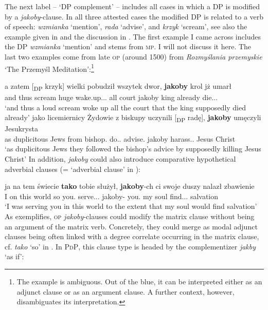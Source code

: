 \documentclass[output=paper
,modfonts
,nonflat]{langsci/langscibook}
\begin{document}
The next label – `DP complement' – includes all cases in which a DP is modified by a \emph{jakoby}-clause. In all three attested cases the modified DP is related to a verb of speech: \emph{wzmianka} `mention', \emph{rada} `advise', and \emph{krzyk} `scream', see also the example given in  and the discussion in . The first example I came across includes the DP \emph{wzmianka} `mention' and stems from \textsc{mp}. I will not discuss it here. The last two examples come from late \textsc{op} (around 1500) from \emph{Rozmyślania przemyskie} `The Przemyśl Meditation':\footnote{The example  is ambiguous. Out of the blue, it can be interpreted either as an adjunct clause or as an argument clause. A further context, however, disambiguates its interpretation.}          

\ea \ea \gll	a zatem [\textsubscript{DP} krzyk] wielki pobudził wszytek dwor, \textbf{jakoby} krol jż umarł \label{adjunct_argument} \\
		and thus {} scream huge wake.up.{\lptcp}.{\sg}.{\masc} all court jakoby king already die.{\lptcp}.{\sg}.{\masc} \\
	\glt	`and thus a loud scream woke up all the court that  the king supposedly died already'  
	\ex\gll		jako licemiernicy Żydowie z biskupy uczynili \hspace{1,0cm} [\textsubscript{DP} radę], \textbf{jakoby} umęczyli Jesukrysta \\
            as duplicitous Jews from bishop.{\gen} do.{\lptcp}.{\vir} {} {} advise.{\acc} jakoby harass.{\lptcp}.{\vir} {Jesus Christ} \\   
	\glt	 `as duplicitous Jews they followed the bishop's advice by supposedly killing Jesus Christ'  
    \z\z		
In addition, \emph{jakoby} could also introduce comparative hypothetical adverbial clauses (= `adverbial clause' in ):

\ea \gll ja na tem świecie \textbf{tako} tobie służył, \textbf{jakoby}-ch ci swoje duszy nalazł zbawienie \label{adjunct-jakoby} \\
		I on this world so you.{\dat} serve.{\lptcp}.{\sg}.{\masc} jakoby-{\aor} you.{\dat} my soul find.{\lptcp}.{\sg}.{\masc} salvation \\
\glt	`I was serving you in this world to the extent that my soul would find salvation'  
\z
As  exemplifies, \textsc{op} \emph{jakoby}-clauses could modify the matrix clause without being an argument of the matrix verb. Concretely, they could merge as modal adjunct clauses being often linked with a degree correlate occurring in the matrix clause, cf. \emph{tako} `so' in . In \textsc{PdP}, this clause type is headed by the complementizer \emph{jakby} `as if':
\end{document}
